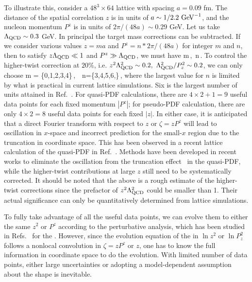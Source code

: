 To illustrate this, consider a $48^3\times64$ lattice with spacing $a=0.09$ fm. The distance of the spatial correlation $z$ is in units of $a\sim1/2.2\ {\rm GeV}^{-1}$, and the nucleon momentum $P^z$ is in units of $2\pi/(48a)\sim0.29$ GeV. Let us take $\Lambda_{\rm QCD}\sim 0.3$ GeV. In principal the target mass corrections can be subtracted. If we consider various values $z=ma$ and $P^z=n*2\pi/(48a)$ for integer $m$ and $n$, then to satisfy $z\Lambda_{\rm QCD}\ll1$ and $P^z\gg \Lambda_{\rm QCD}$, we must have
\beq
 m\,,\,\,\,\quad n\,.
\eeq
To control the higher-twist correction at $20\%$, i.e. $z^2\Lambda_{\rm QCD}^2\sim0.2,\ \Lambda_{\rm QCD}^2/P_z^2\sim0.2$, we can only choose
\beq
m = \{0,1,2,3,4\}\,,\,\,\,\, n=\{3,4,5,6,\cdots\}\,,
\eeq
where the largest value for $n$ is limited by what is practical in current lattice simulations. Six is the largest number of units attained in Ref.~\cite{Orginos:2017kos}. For quasi-PDF calculations, there are $4\times2+1=9$ useful data points for each fixed momentum $|P^z|$; for pseudo-PDF calculation, there are only $4\times2=8$ useful data points for each fixed $|z|$. In either case, it is anticipated that a direct Fourier transform with respect to $z$ or $\zeta=zP^z$ will lead to oscillation in $x$-space and incorrect prediction for the small-$x$ region due to the truncation in coordinate space. This has been observed in a recent lattice calculation of the quasi-PDF in Ref.~\cite{Chen:2017mzz}. Methods have been developed in recent works to eliminate the oscillation from the truncation effect~\cite{Lin:2017ani,Zhang:2017gau} in the quasi-PDF, while the higher-twist contributions at large $z$ still need to be systematically corrected. It should be noted that the above is a rough estimate of the higher-twist corrections since the prefactor of $z^2\Lambda_{\rm QCD}^2$ could be smaller than 1. Their actual significance can only be quantitatively determined from lattice simulations.

To fully take advantage of all the useful data points, we can evolve them to either the same $z^2$ or $P^z$ according to the perturbative analysis, which has been studied in Refs.~\cite{Orginos:2017kos,Karpie:2017bzm,Radyushkin:2017lvu} for the \spcorr. However, since the evolution equation of the \spcorr in $\ln z^2$ or $\ln P_z^2$ follows a nonlocal convolution in $\zeta=zP^z$ or $z$, one has to know the full information in coordinate space to do the evolution. With limited number of data points, either large uncertainties or adopting a model-dependent assumption about the shape is inevitable.

